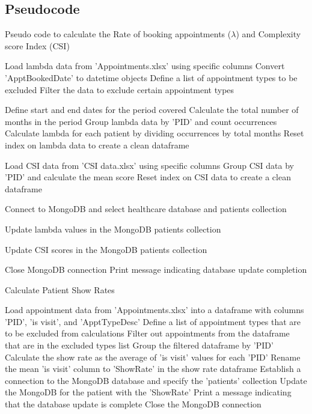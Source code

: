 \documentclass[11pt]{article}
\theoremstyle{definition}
\begin{document}
\subsection*{Pseudocode}
\begin{algorithm}
\caption{Pseudo code to calculate the Rate of booking appointments ($\lambda$) and Complexity score Index (CSI) }
\begin{algorithmic}[1]

\State Load lambda data from 'Appointments.xlsx' using specific columns
\State Convert 'ApptBookedDate' to datetime objects
\State Define a list of appointment types to be excluded
\State Filter the data to exclude certain appointment types

\State Define start and end dates for the period covered
\State Calculate the total number of months in the period
\State Group lambda data by 'PID' and count occurrences
\State Calculate lambda for each patient by dividing occurrences by total months
\State Reset index on lambda data to create a clean dataframe

\State Load CSI data from 'CSI data.xlsx' using specific columns
\State Group CSI data by 'PID' and calculate the mean score
\State Reset index on CSI data to create a clean dataframe

\State Connect to MongoDB and select healthcare database and patients collection

    \State Update lambda values in the MongoDB patients collection
\EndFor

    \State Update CSI scores in the MongoDB patients collection
\EndFor

\State Close MongoDB connection
\State Print message indicating database update completion

\end{algorithmic}
\end{algorithm}
\newpage
\begin{algorithm}
\caption{Calculate Patient Show Rates}
\begin{algorithmic}[1]

\State Load appointment data from 'Appointments.xlsx' into a dataframe with columns 'PID', 'is visit', and 'ApptTypeDesc'
\State Define a list of appointment types that are to be excluded from calculations
\State Filter out appointments from the dataframe that are in the excluded types list
\State Group the filtered dataframe by 'PID'
\State Calculate the show rate as the average of 'is visit' values for each 'PID'
\State Rename the mean 'is visit' column to 'ShowRate' in the show rate dataframe
\State Establish a connection to the MongoDB database and specify the 'patients' collection
    \State Update the MongoDB for the patient with the 'ShowRate'
\EndFor
\State Print a message indicating that the database update is complete
\State Close the MongoDB connection

\end{algorithmic}
\end{algorithm}
\end{document}
